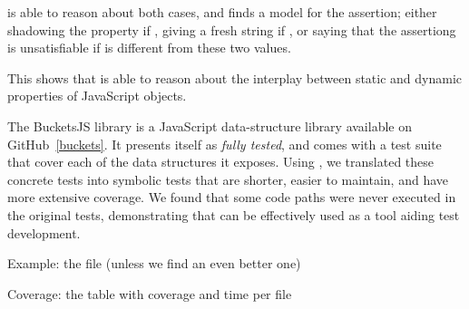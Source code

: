 \cosette is able to reason about both cases, and finds a model for the assertion; either shadowing the property if , giving a fresh string if , or saying that the assertiong is unsatisfiable if  is different from these two values.

This shows that \cosette is able to reason about the interplay between static and dynamic properties of JavaScript objects.
 

The BucketsJS library is a JavaScript data-structure library available on GitHub~\ref{buckets}.
It presents itself as \emph{fully tested}, and comes with a test suite that cover each of the data structures it exposes.
Using \cosette, we translated these concrete tests into symbolic tests that are shorter, easier to maintain, and have more extensive coverage.
We found that some code paths were never executed in the original tests, demonstrating that \cosette can be effectively used as a tool aiding test development.


Example: the  file (unless we find an even better one)


Coverage: the table with coverage and time per file

